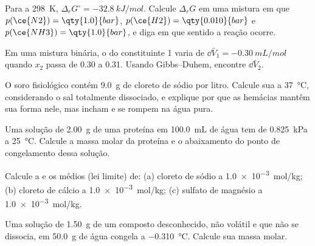 \begin{exercise}[$\star$]\label{exo:b2:chemical-potential:4}
Para  a \qty{298}{K}, $\Delta_r G^\circ =
\qty{-32.8}{kJ/mol}$. Calcule $\Delta_r G$ em uma mistura em que
$p(\ce{N2}) = \qty{1.0}{bar}$, $p(\ce{H2}) = \qty{0.010}{bar}$ e
$p(\ce{NH3}) = \qty{1.0}{bar}$, e diga em que sentido a reação ocorre.
\end{exercise}

\begin{exercise}[$\star\star$]\label{exo:b2:chemical-potential:5}
Em uma mistura binária, o  do constituinte 1 varia de
$\dd\bar V_1 = \qty{-0.30}{mL/mol}$ quando $x_2$ passa de 0.30 a 0.31. Usando
Gibbs--Duhem, encontre $\dd\bar V_2$.
\end{exercise}

\begin{exercise}[$\star\star$]\label{exo:b2:chemical-potential:6}
O soro fisiológico contém \qty{9.0}{g} de cloreto de sódio por litro.
Calcule sua  a \qty{37}{\celsius}, considerando o sal
totalmente dissociado, e explique por que as hemácias mantêm sua forma
nele, mas incham e se rompem na água pura.
\end{exercise}

\begin{exercise}[$\star\star$]\label{exo:b2:chemical-potential:7}
Uma solução de \qty{2.00}{g} de uma proteína em \qty{100.0}{mL} de água tem
 de \qty{0.825}{kPa} a \qty{25}{\celsius}. Calcule a massa
molar da proteína e o abaixamento do ponto de congelamento dessa solução.
\end{exercise}

\begin{exercise}[$\star\star$]\label{exo:b2:chemical-potential:8}
Calcule a  e os  médios (lei limite)
de: (a) cloreto de sódio a \qty{1.0e-3}{mol/kg}; (b) cloreto de cálcio a
\qty{1.0e-3}{mol/kg}; (c) sulfato de magnésio a \qty{1.0e-3}{mol/kg}.
\end{exercise}

\begin{exercise}[$\star\star$]\label{exo:b2:chemical-potential:9}
Uma solução de \qty{1.50}{g} de um composto desconhecido, não volátil e que
não se dissocia, em \qty{50.0}{g} de água congela a \qty{-0.310}{\celsius}.
Calcule sua massa molar.
\end{exercise}

